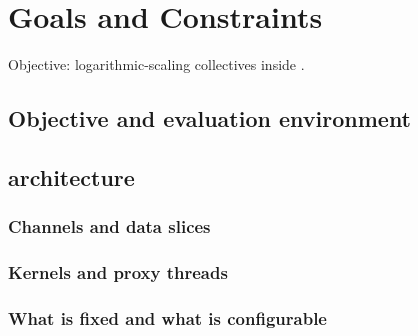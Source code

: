 \chapter{Goals and Constraints}\label{ch:goals}

Objective: logarithmic-scaling collectives inside \nccl{}.

\section{Objective and evaluation environment}
\section{\nccl{} architecture}
\subsection{Channels and data slices}
\subsection{Kernels and proxy threads}
\subsection{What is fixed and what is configurable}
